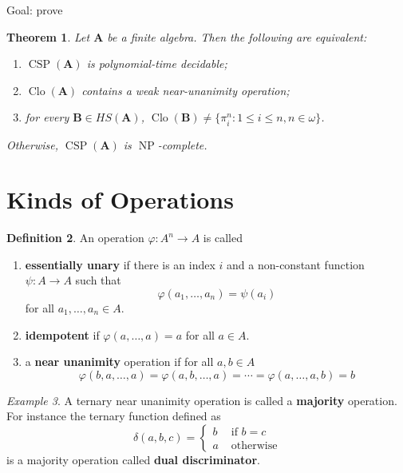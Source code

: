 \documentclass{amsart}
\theoremstyle{plain}
\newtheorem{theorem}{Theorem}[section]
\theoremstyle{definition}
\newtheorem{definition}[theorem]{Definition}
\theoremstyle{remark}
\newtheorem{example}[theorem]{Example}
\def\phi{\varphi}
\DeclareMathOperator{\Clo}{Clo}
\DeclareMathOperator{\CSP}{CSP}
\DeclareMathOperator{\NP}{NP}
\begin{document}
Goal: prove 

\begin{theorem}
    Let $\mathbf{A}$ be a finite 
    algebra. 
    Then the following are equivalent: 
    \begin{enumerate}
        \item $\CSP(\mathbf{A})$ is polynomial-time decidable; 
        \item $\Clo(\mathbf{A})$ contains a weak near-unanimity operation; 
        \item for every $\mathbf{B} \in HS(\mathbf{A})$, $\Clo(\mathbf{B}) \neq \{\pi^n_i: 1 \le i \le n, n \in \omega\}$. 
    \end{enumerate}
    Otherwise, $\CSP(\mathbf{A})$ is $\NP$-complete. 
\end{theorem}

\section{Kinds of Operations}

\begin{definition}
    An operation $\phi: A^n \to A$ is called 
    \begin{enumerate}
        \item \textbf{essentially unary} if there is an index $i$ and a non-constant function $\psi: A \to A$ such that 
        \begin{equation*}
        \phi(a_1, \ldots, a_n) = \psi(a_i)
        \end{equation*}
        for all $a_1, \ldots, a_n \in A$. 
        \item \textbf{idempotent} if $\phi(a, \ldots, a)=a$ for all $a \in A$. 
        \item a \textbf{near unanimity} operation if for all $a,b \in A$ 
        \begin{equation*}
            \phi(b, a, \ldots, a) = \phi(a, b, \ldots, a) = \cdots = \phi(a, \ldots, a, b)=b 
        \end{equation*}
    \end{enumerate}
\end{definition}

\begin{example}
    \label{dual}
    A ternary near unanimity operation is called a \textbf{majority} operation. 
    For instance the ternary function defined as 
    \begin{equation*}
        \delta(a,b,c) = 
        \begin{cases}
            b & \text{ if } b = c \\
            a & \text{ otherwise}
        \end{cases}
    \end{equation*}
    is a majority operation called \textbf{dual discriminator}. 
\end{example}
\end{document}
